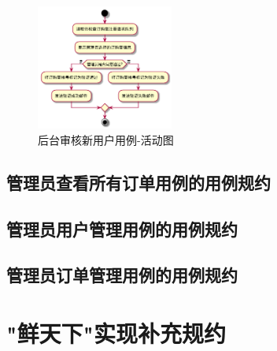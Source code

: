 \begin{figure}[htp]
    \centering
    \includegraphics[width=0.4\textwidth]{figure/usecase/uc_sub/uc_admin_check_client.png}
    \caption{后台审核新用户用例-活动图}
    \label{fig:shenhe-order-uml}
\end{figure}

\subsection{管理员查看所有订单用例的用例规约}



\subsection{管理员用户管理用例的用例规约}


\subsection{管理员订单管理用例的用例规约}


\section{"鲜天下"实现补充规约}


